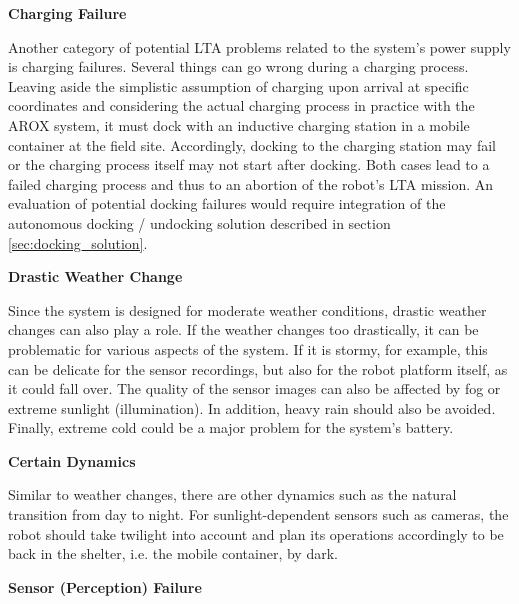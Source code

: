 \documentclass[english, master, utf8]{base/thesis_KBS}
\begin{document}
\noindent
\textbf{Charging Failure}\newline

\noindent
Another category of potential LTA problems related to the system's power supply is charging failures. Several things can go wrong during a charging process. 
Leaving aside the simplistic assumption of charging upon arrival at specific coordinates and considering the actual charging process 
in practice with the AROX system, it must dock with an inductive charging station in a mobile container at the field site.
Accordingly, docking to the charging station may fail or the charging process itself may not start after docking.
Both cases lead to a failed charging process and thus to an abortion of the robot's LTA mission. An evaluation of potential docking failures would require 
integration of the autonomous docking / undocking solution described in section \ref{sec:docking_solution}.\newline

\noindent
\textbf{Drastic Weather Change}\newline

\noindent
Since the system is designed for moderate weather conditions, drastic weather changes can also play a role.
If the weather changes too drastically, it can be problematic for various aspects of the system.
If it is stormy, for example, this can be delicate for the sensor recordings, but also for the robot platform itself, as it could fall over.
The quality of the sensor images can also be affected by fog or extreme sunlight (illumination).
In addition, heavy rain should also be avoided. Finally, extreme cold could be a major problem for the system's battery.\newline

\noindent
\textbf{Certain Dynamics}\newline

\noindent
Similar to weather changes, there are other dynamics such as the natural transition from day to night. For sunlight-dependent sensors such as cameras, 
the robot should take twilight into account and plan its operations accordingly to be back in the shelter, i.e. the mobile container, by dark.\newline

\noindent
\textbf{Sensor (Perception) Failure}\newline
\end{document}
